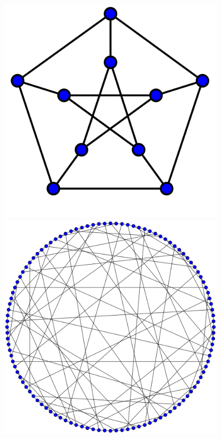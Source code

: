 \documentclass[11pt,a4paper]{article}
\begin{document}
\begin{center}
\begin{figure}[h!]
\includegraphics[scale=0.10]{Petersen}
\hspace*{3mm}
\includegraphics[scale=0.10]{Balaban}

\end{figure}
\end{center}
\end{document}
